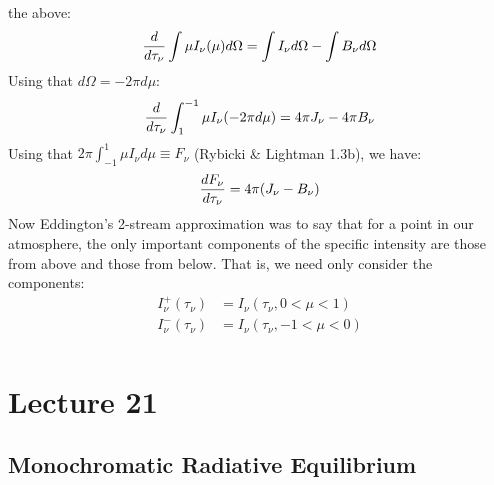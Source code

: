 \documentclass[11pt]{article}
\begin{document}
the above:
\def\ddtau#1{{d#1\over d\tau_\nu}}
$$\ddtau{}\int{\mu I_\nu(\mu)d\Omega}=\int{I_\nu d\Omega}-\int{B_\nu d\Omega}$$
Using that $d\Omega=-2\pi d\mu$:
$$\ddtau{}\int_1^{-1}{\mu I_\nu(-2\pi d\mu)}=4\pi J_\nu-4\pi B_\nu$$
Using that $2\pi\int_{-1}^1{\mu I_\nu d\mu\equiv F_\nu}$
(Rybicki \& Lightman 1.3b), we have:
$$\ddtau{F_\nu}=4\pi(J_\nu-B_\nu)$$
Now Eddington's 2-stream approximation was to say that for a point in our
atmosphere, the only important components of the specific intensity are
those from above and those from below.  That is, we need only consider
the components:
$$\begin{aligned}I_\nu^+(\tau_\nu)&=I_\nu(\tau_\nu,0<\mu<1)\\ 
I_\nu^-(\tau_\nu)&=I_\nu(\tau_\nu,-1<\mu<0)\\ \end{aligned}$$

\section*{ Lecture 21 }

\subsection*{ Monochromatic Radiative Equilibrium}
\end{document}

